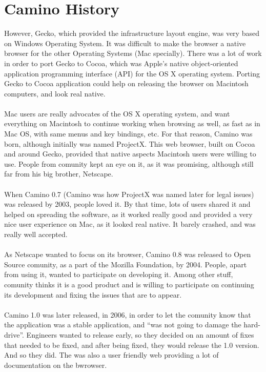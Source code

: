 \documentclass[11pt]{article}
\begin{document}
\section{Camino History}
However, Gecko, which provided the infrastructure layout engine, was very based on Windows Operating System. It was difficult to make the browser a native browser for the other Operating Systems (Mac specially). There was a lot of work in order to port Gecko to Cocoa, which was Apple's native object-oriented application programming interface (API) for the OS X operating system. Porting Gecko to Cocoa application could help on releasing the browser on Macintosh computers, and look real native.\\
\\
Mac users are really advocates of the OS X operating system, and want everything on Macintosh to continue working when browsing as well, as fast as in Mac OS, with same menus and key bindings, etc. For that reason, Camino was born, although initially was named ProjectX. This web browser, built on Cocoa and around Gecko, provided that native aspects Macintosh users were willing to use. People from comunity kept an eye on it, as it was promising, although still far from his big brother, Netscape.\\
\\
When Camino 0.7 (Camino was how ProjectX was named later for legal issues) was released by 2003, people loved it. By that time, lots of users shared it and helped on spreading the software, as it worked really good and provided a very nice user experience on Mac, as it looked real native. It barely crashed, and was really well accepted.\\
\\
As Netscape wanted to focus on its browser, Camino 0.8 was released to Open Source comunity, as a part of the Mozilla Foundation, by 2004. People, apart from using it, wanted to participate on developing it. Among other stuff, comunity thinks it is a good product and is willing to participate on continuing its development and fixing the issues that are to appear.\\
\\
Camino 1.0 was later released, in 2006, in order to let the comunity know that the application was a stable application, and ``was not going to damage the hard-drive''. Engineers wanted to release early, so they decided on an amount of fixes that needed to be fixed, and after being fixed, they would release the 1.0 version. And so they did. The was also a user friendly web providing a lot of documentation on the bwrowser.
\end{document}
